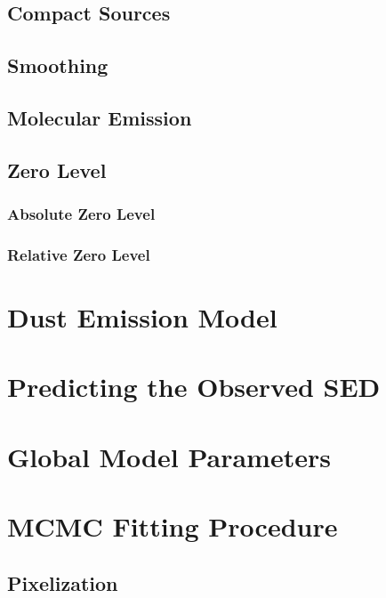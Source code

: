 \documentclass{emulateapj}
\begin{document}
\subsection{Compact Sources}
\label{sec:ptsrc}

\subsection{Smoothing}
\label{sec:smth}

\subsection{Molecular Emission}
\label{sec:mole}

\subsection{Zero Level}
\label{sec:zp}

\subsubsection{Absolute Zero Level}
\label{sec:zp_abs}

\subsubsection{Relative Zero Level}
\label{sec:relzero}

\section{Dust Emission Model}
\label{sec:modeling}

\section{Predicting the Observed SED}
\label{sec:bpcorr}

\section{Global Model Parameters}
\label{sec:global}

\section{MCMC Fitting Procedure}
\label{sec:fitting}

\subsection{Pixelization}
\label{sec:pix}
\end{document}

